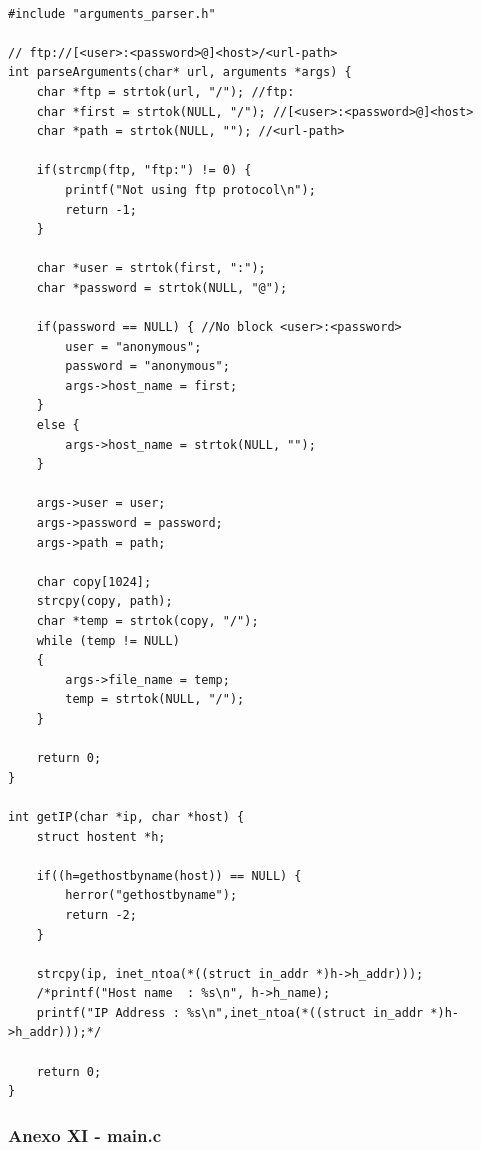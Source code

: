 \documentclass[11pt]{article}
\begin{document}
\begin{lstlisting}[style=CStyle]

#include "arguments_parser.h"

// ftp://[<user>:<password>@]<host>/<url-path>
int parseArguments(char* url, arguments *args) {
    char *ftp = strtok(url, "/"); //ftp:
    char *first = strtok(NULL, "/"); //[<user>:<password>@]<host>
    char *path = strtok(NULL, ""); //<url-path>

    if(strcmp(ftp, "ftp:") != 0) {
        printf("Not using ftp protocol\n");
        return -1;
    }

    char *user = strtok(first, ":");
    char *password = strtok(NULL, "@");

    if(password == NULL) { //No block <user>:<password>
        user = "anonymous";
        password = "anonymous";
        args->host_name = first;
    }
    else {
        args->host_name = strtok(NULL, "");
    }

    args->user = user;
    args->password = password;
    args->path = path;

    char copy[1024];
    strcpy(copy, path);
    char *temp = strtok(copy, "/");
    while (temp != NULL)
    {
        args->file_name = temp;
        temp = strtok(NULL, "/");
    }
    
    return 0;
}

int getIP(char *ip, char *host) {
    struct hostent *h;
    
    if((h=gethostbyname(host)) == NULL) {  
        herror("gethostbyname");
        return -2;
    }

    strcpy(ip, inet_ntoa(*((struct in_addr *)h->h_addr)));
    /*printf("Host name  : %s\n", h->h_name);
    printf("IP Address : %s\n",inet_ntoa(*((struct in_addr *)h->h_addr)));*/

    return 0;
}

\end{lstlisting}

\pagebreak

\subsubsection{Anexo XI - main.c}
\end{document}
